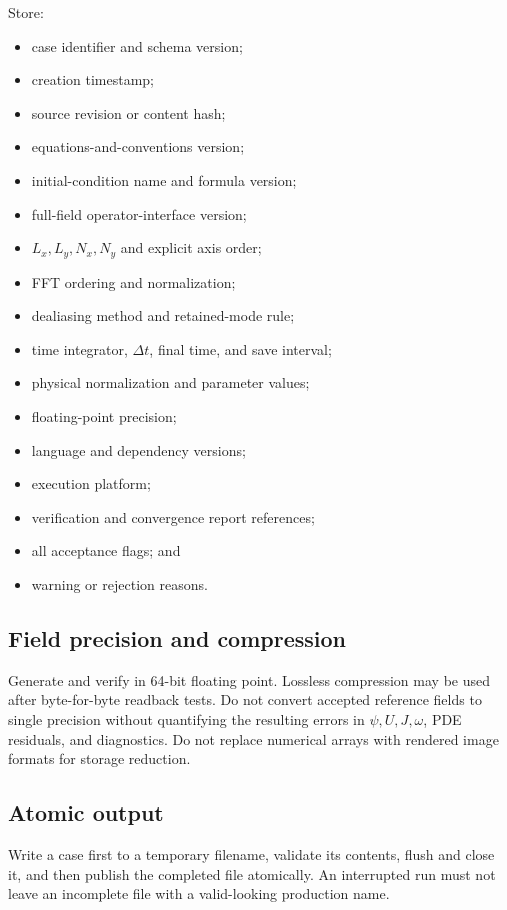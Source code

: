 \documentclass[11pt]{article}
\begin{document}
Store:
\begin{itemize}
  \item case identifier and schema version;
  \item creation timestamp;
  \item source revision or content hash;
  \item equations-and-conventions version;
  \item initial-condition name and formula version;
  \item full-field operator-interface version;
  \item $L_x,L_y,N_x,N_y$ and explicit axis order;
  \item FFT ordering and normalization;
  \item dealiasing method and retained-mode rule;
  \item time integrator, $\Delta t$, final time, and save interval;
  \item physical normalization and parameter values;
  \item floating-point precision;
  \item language and dependency versions;
  \item execution platform;
  \item verification and convergence report references;
  \item all acceptance flags; and
  \item warning or rejection reasons.
\end{itemize}

\subsection{Field precision and compression}

Generate and verify in 64-bit floating point. Lossless compression may be used after byte-for-byte readback tests. Do not convert accepted reference fields to single precision without quantifying the resulting errors in $\psi,U,J,\omega$, PDE residuals, and diagnostics. Do not replace numerical arrays with rendered image formats for storage reduction.

\subsection{Atomic output}

Write a case first to a temporary filename, validate its contents, flush and close it, and then publish the completed file atomically. An interrupted run must not leave an incomplete file with a valid-looking production name.
\end{document}
